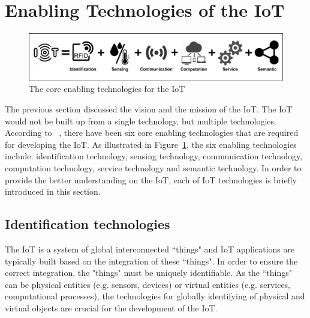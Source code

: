\newpage
\section{Enabling Technologies of the IoT}
\label{sec:technologies_of_iot}
 
\begin{figure}[ht!]
    \centering
    \includegraphics[scale=.75]{Pictures/c2/2-1-IoT-Elements.pdf}
    \caption{The core enabling technologies for the IoT~\citep{Al-Fuqaha:2015}}
    \label{fig:2.2-technologies}
\end{figure}

The previous section discussed the vision and the mission of the IoT. 
The IoT would not be built up from a single technology, but multiple technologies. 
According to ~\cite{Al-Fuqaha:2015}, there have been six core enabling technologies that are required for developing the IoT.
As illustrated in Figure~\ref{fig:2.2-technologies}, the six enabling technologies include: identification technology, sensing technology, communication technology, computation technology, service technology and semantic technology.
In order to provide the better understanding on the IoT, each of IoT technologies is briefly introduced in this section.


\subsection{Identification technologies}
\label{subsec:identification}

The IoT is a system of global interconnected ``things" and IoT applications are typically built based on the integration of these ``things".
In order to ensure the correct integration, the "things" must be uniquely identifiable. 
As the ``things" can be physical entities (e.g. sensors, devices) or virtual entities (e.g. services, computational processes), the technologies for globally identifying of physical and virtual objects are crucial for the development of the IoT.

